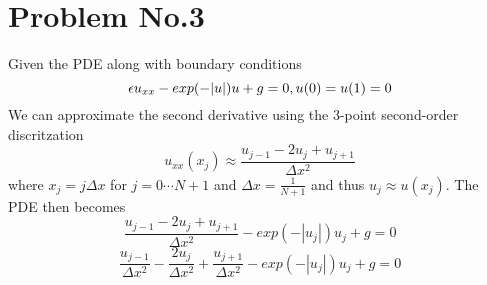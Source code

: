 \section*{Problem No.3} \label{sec:prob3}
Given the PDE along with boundary conditions 
\[
\epsilon u_{xx}-exp(-|u|)u+g =0,\\
u(0)=u(1)=0
\]
We can approximate the second derivative using the 3-point second-order discritzation 
\[
u_{xx}(x_{j}) \approx \frac{u_{j-1}-2u_{j}+u_{j+1}}{\Delta x^{2}}
\]
where $x_{j}=j\Delta x$ for $j=0 \cdots N+1$ and $\Delta x = \frac{1}{N+1}$ and thus $u_{j}\approx u(x_{j})$. The PDE then becomes 
\[
\frac{u_{j-1}-2u_{j}+u_{j+1}}{\Delta x^{2}} - exp(-|u_{j}|)u_{j}+g=0
\]
\[
\frac{ u_{j-1}}{\Delta x^{2}}-\frac{2u_{j}}{\Delta x^{2}} + \frac{ u_{j+1}}{\Delta x^{2}} -exp(-|u_{j}|)u_{j}+g=0
\]
